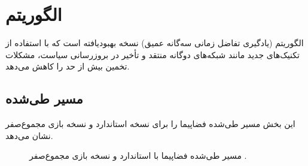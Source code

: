 \section{الگوریتم }
\label{sec:td3_results}

الگوریتم  (یادگیری تفاضل زمانی سه‌گانه عمیق) نسخه بهبودیافته  است که با استفاده از تکنیک‌های جدید مانند شبکه‌های دوگانه منتقد و تأخیر در بروزرسانی سیاست، مشکلات تخمین بیش از حد را کاهش می‌دهد.

\subsection{مسیر طی‌شده}
این بخش مسیر طی‌شده فضاپیما را برای نسخه استاندارد و نسخه بازی مجموع‌صفر  نشان می‌دهد.
\begin{figure}[H]
	\centering
	\caption{مسیر طی‌شده فضاپیما با  استاندارد و نسخه بازی مجموع‌صفر .}
\end{figure}

